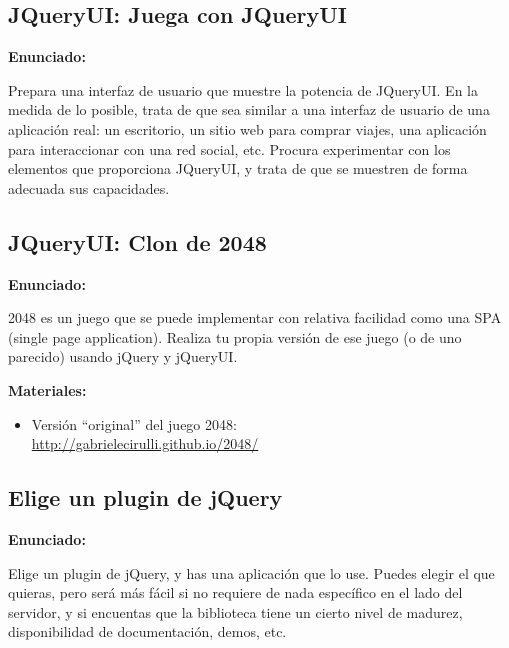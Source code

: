\subsection{JQueryUI: Juega con JQueryUI}
\label{subsec:otras-jqueryui-juega}

\textbf{Enunciado:}

Prepara una interfaz de usuario que muestre la potencia de JQueryUI. En la medida de lo posible, trata de que sea similar a una interfaz de usuario de una aplicación real: un escritorio, un sitio web para comprar viajes, una aplicación para interaccionar con una red social, etc. Procura experimentar con los elementos que proporciona JQueryUI, y trata de que se muestren de forma adecuada sus capacidades.

\subsection{JQueryUI: Clon de 2048}
\label{subsec:otras-jquery-2048}

\textbf{Enunciado:}

2048 es un juego que se puede implementar con relativa facilidad como una SPA (single page application). Realiza tu propia versión de ese juego (o de uno parecido) usando jQuery y jQueryUI.

\textbf{Materiales:}

\begin{itemize}
\item Versión ``original'' del juego 2048: \\
  \url{http://gabrielecirulli.github.io/2048/}
\end{itemize}

\subsection{Elige un plugin de jQuery}
\label{subsec:otras-jquery-plugin}

\textbf{Enunciado:}

Elige un plugin de jQuery, y has una aplicación que lo use. Puedes elegir el que quieras, pero será más fácil si no requiere de nada específico en el lado del servidor, y si encuentas que la biblioteca tiene un cierto nivel de madurez, disponibilidad de documentación, demos, etc.

